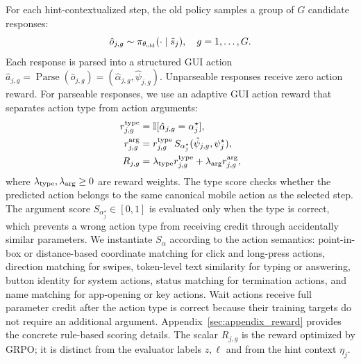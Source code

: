 \documentclass{llmxive}
\begin{document}
For each hint-contextualized step, the old policy samples a group of $G$ candidate responses:
\begin{equation}
\label{eq:hint-grpo-sampling}
    \hat{o}_{j,g}\sim \pi_{\theta_{\rm old}}(\cdot\mid\tilde{s}_j),
    \quad g=1,\ldots,G.
\end{equation}
Each response is parsed into a structured GUI action
$\hat a_{j,g}=\operatorname{Parse}(\hat{o}_{j,g})=(\hat{\alpha}_{j,g},\hat{\psi}_{j,g})$.
Unparseable responses receive zero action reward. For parseable responses, we use an adaptive GUI action reward that separates action type from action arguments:
\begin{equation}
\label{eq:gui-reward}
\begin{aligned}
    r^{\rm type}_{j,g}
    &=\mathbb{I}[\hat{\alpha}_{j,g}=\alpha_j^\star],\\
    r^{\rm arg}_{j,g}
    &=r^{\rm type}_{j,g}\,
      S_{\alpha_j^\star}(\hat{\psi}_{j,g},\psi_j^\star),\\
    R_{j,g}
    &=\lambda_{\rm type}r^{\rm type}_{j,g}
      +\lambda_{\rm arg}r^{\rm arg}_{j,g},
\end{aligned}
\end{equation}
where $\lambda_{\rm type},\lambda_{\rm arg}\geq0$ are reward weights. The type score checks whether the predicted action belongs to the same canonical mobile action as the selected step. The argument score $S_{\alpha_j^\star}\in[0,1]$ is evaluated only when the type is correct, which prevents a wrong action type from receiving credit through accidentally similar parameters. We instantiate $S_{\alpha}$ according to the action semantics: point-in-box or distance-based coordinate matching for click and long-press actions, direction matching for swipes, token-level text similarity for typing or answering, button identity for system actions, status matching for termination actions, and name matching for app-opening or key actions. Wait actions receive full parameter credit after the action type is correct because their training targets do not require an additional argument. Appendix~\ref{sec:appendix_reward} provides the concrete rule-based scoring details. The scalar $R_{j,g}$ is the reward optimized by GRPO; it is distinct from the evaluator labels $z,\ell$ and from the hint context $\eta_j$.
\end{document}
